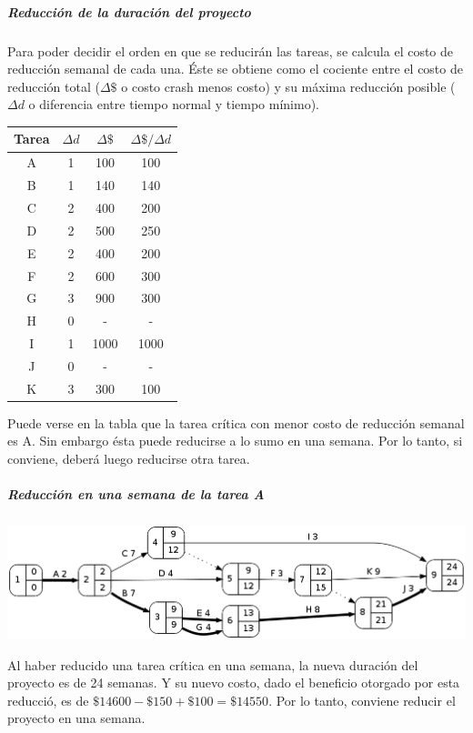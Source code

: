 \documentclass[a4paper,10pt]{article}
\begin{document}
  \subparagraph{Reducción de la duración del proyecto}

  Para poder decidir el orden en que se reducirán las tareas, se calcula el costo de reducción semanal de cada una. Éste se obtiene como el cociente entre el costo de reducción total ($\Delta \$$ o costo crash menos costo) y su máxima reducción posible ($\Delta d$ o diferencia entre tiempo normal y tiempo mínimo).

   \begin{center}
   \begin{tabular}{|| c | c | c | c ||}
   \hline 
      Tarea & $\Delta d$ & $\Delta \$$ & $\Delta \$ / \Delta d$ \\ \hline \hline
      A & 1 & 100 & 100 \\ \hline
      B & 1 & 140 & 140 \\ \hline 
      C & 2 & 400 & 200 \\ \hline
      D & 2 & 500 & 250 \\ \hline
      E & 2 & 400 & 200 \\ \hline
      F & 2 & 600 & 300 \\ \hline
      G & 3 & 900 & 300 \\ \hline
      H & 0 &  -  & -   \\ \hline
      I & 1 &1000 & 1000\\ \hline
      J & 0 &  -  & -   \\ \hline
      K & 3 & 300 & 100 \\ \hline
   \end{tabular}
   \end{center}

   Puede verse en la tabla que la tarea crítica con menor costo de reducción semanal es A. Sin embargo ésta puede reducirse a lo sumo en una semana. Por lo tanto, si conviene, deberá luego reducirse otra tarea.

  \subparagraph {Reducción en una semana de la tarea A}
  \begin{center}
    \includegraphics[scale=0.4,keepaspectratio=true]{img/ej3-1.png} 
  \end{center}

  Al haber reducido una tarea crítica en una semana, la nueva duración del proyecto es de 24 semanas. Y su nuevo costo, dado el beneficio otorgado por esta reducció, es de $\$14600 - \$150 + \$100 = \$14550$. Por lo tanto, conviene reducir el proyecto en una semana.
\end{document}
